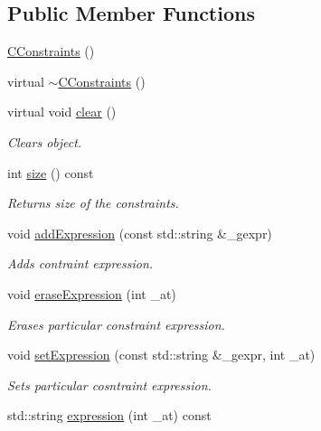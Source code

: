 \subsection*{Public Member Functions}
\begin{DoxyCompactItemize}
\item 
\hyperlink{class_go_s_u_m_1_1_c_constraints_ad4a1d290fbe6e1932b08f4fb1695b0a6}{C\-Constraints} ()
\item 
virtual \hyperlink{class_go_s_u_m_1_1_c_constraints_a79a84d644f7e8022ce16487b4707bc33}{$\sim$\-C\-Constraints} ()
\item 
virtual void \hyperlink{class_go_s_u_m_1_1_c_constraints_a45acde7b103ba957a718031b6ecebf69}{clear} ()
\begin{DoxyCompactList}\small\item\em Clears object. \end{DoxyCompactList}\item 
int \hyperlink{class_go_s_u_m_1_1_c_constraints_a9979ee367d1f0592e0ddea874307527c}{size} () const 
\begin{DoxyCompactList}\small\item\em Returns size of the constraints. \end{DoxyCompactList}\item 
void \hyperlink{class_go_s_u_m_1_1_c_constraints_ab50ae4d923f0a67ed6bf468b2e7b3b8b}{add\-Expression} (const std\-::string \&\-\_\-gexpr)
\begin{DoxyCompactList}\small\item\em Adds contraint expression. \end{DoxyCompactList}\item 
void \hyperlink{class_go_s_u_m_1_1_c_constraints_a8c242c266df5f843807e3f000e724929}{erase\-Expression} (int \-\_\-at)
\begin{DoxyCompactList}\small\item\em Erases particular constraint expression. \end{DoxyCompactList}\item 
void \hyperlink{class_go_s_u_m_1_1_c_constraints_a75b0405e1cb0c978c5eccc5df2fdbd8a}{set\-Expression} (const std\-::string \&\-\_\-gexpr, int \-\_\-at)
\begin{DoxyCompactList}\small\item\em Sets particular cosntraint expression. \end{DoxyCompactList}\item 
std\-::string \hyperlink{class_go_s_u_m_1_1_c_constraints_af1e75f5d326a3466c2c778ccca1d82fe}{expression} (int \-\_\-at) const 

\end{DoxyCompactItemize}
